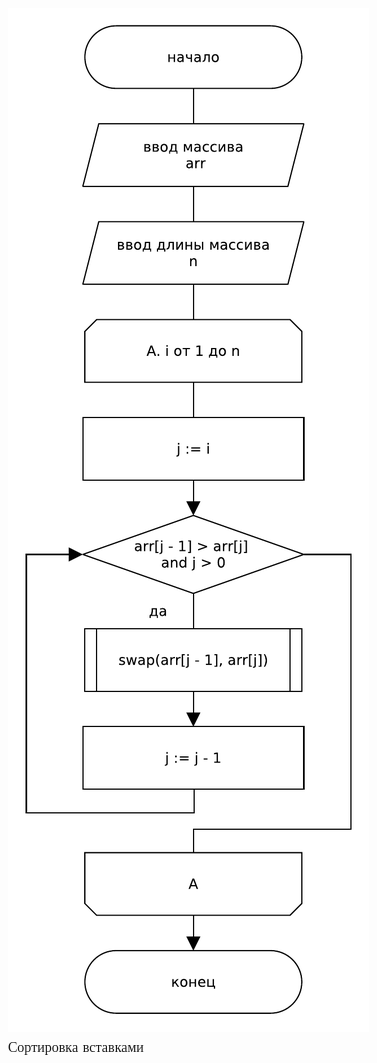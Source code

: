 \begin{figure}[H]
    \centering
    \includegraphics[scale=0.65]{./pdf/insertionsort.pdf}
    \caption{Сортировка вставками}
    \label{img:ins}
\end{figure}

